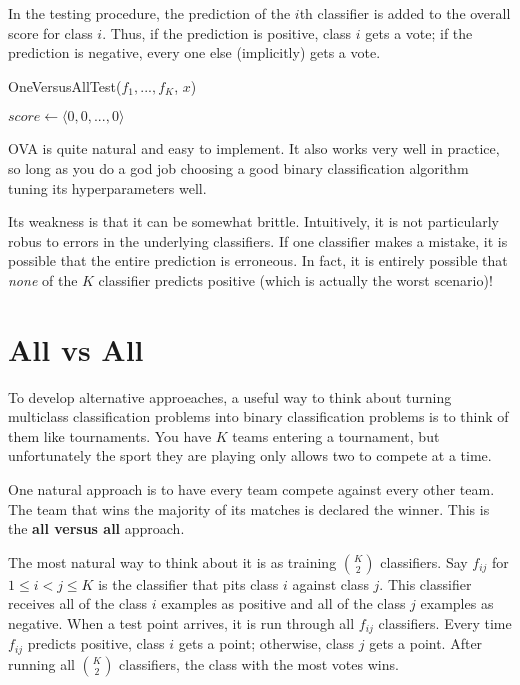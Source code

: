 In the testing procedure, the prediction of the \(i\)th classifier is added to the overall score for class \(i\). Thus, if the prediction is positive, class \(i\) gets a vote; if the prediction is negative, every one else (implicitly) gets a vote.

	\begin{algorithm}
		\caption{OneVersusAllTest($f_1,...,f_K$, $x$)}
		\label{alg:ovatest}
		$score \gets \langle 0,0,...,0 \rangle$\;
		\end{algorithm}

OVA is quite natural and easy to implement. It also works very well in practice, so long as you do a god job choosing a good binary classification algorithm tuning its hyperparameters well.

Its weakness is that it can be somewhat brittle. Intuitively, it is not particularly robus to errors in the underlying classifiers. If one classifier makes a mistake, it is possible that the entire prediction is erroneous. In fact, it is entirely possible that \emph{none} of the \(K\) classifier predicts positive (which is actually the worst scenario)!

\section{All vs All}
To develop alternative approeaches, a useful way to think about turning multiclass classification problems into binary classification problems is to think of them like tournaments. You have \(K\) teams entering a tournament, but unfortunately the sport they are playing only allows two to compete at a time. 

One natural approach is to have every team compete against every other team. The team that wins the majority of its matches is declared the winner. This is the \textbf{all versus all} approach.

The most natural way to think about it is as training \(K \choose 2\) classifiers. Say \(f_{ij}\) for \(1 \leq i < j \leq K\) is the classifier that pits class \(i\) against class \(j\). This classifier receives all of the class \(i\) examples as positive and all of the class \(j\) examples as negative. When a test point arrives, it is run through all \(f_{ij}\) classifiers. Every time \(f_{ij}\) predicts positive, class \(i\) gets a point; otherwise, class \(j\) gets a point. After running all \(K \choose 2\) classifiers, the class with the most votes wins.

